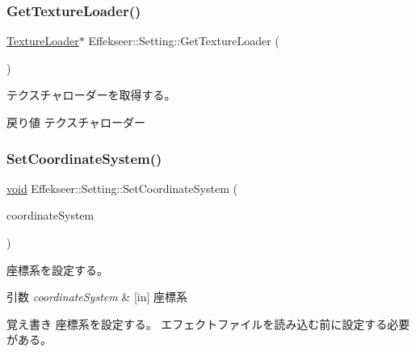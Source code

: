 \subsubsection{\texorpdfstring{Get\+Texture\+Loader()}{GetTextureLoader()}}
{\footnotesize\ttfamily \mbox{\hyperlink{class_effekseer_1_1_texture_loader}{Texture\+Loader}}$\ast$ Effekseer\+::\+Setting\+::\+Get\+Texture\+Loader (\begin{DoxyParamCaption}{ }\end{DoxyParamCaption})}



テクスチャローダーを取得する。 

\begin{DoxyReturn}{戻り値}
テクスチャローダー 
\end{DoxyReturn}
\mbox{\label{class_effekseer_1_1_setting_ab252bfe6bd18b3fafafae0e37351df72}} 
\subsubsection{\texorpdfstring{Set\+Coordinate\+System()}{SetCoordinateSystem()}}
{\footnotesize\ttfamily \mbox{\hyperlink{namespace_effekseer_ab34c4088e512200cf4c2716f168deb56}{void}} Effekseer\+::\+Setting\+::\+Set\+Coordinate\+System (\begin{DoxyParamCaption}\item[{\mbox{\hyperlink{namespace_effekseer_ac8508f8823c5fcf36aac5d2ddee23765}{Coordinate\+System}}}]{coordinate\+System }\end{DoxyParamCaption})}



座標系を設定する。 


\begin{DoxyParams}{引数}
{\em coordinate\+System} & \mbox{[}in\mbox{]} 座標系 \\
\hline
\end{DoxyParams}
\begin{DoxyNote}{覚え書き}
座標系を設定する。 エフェクトファイルを読み込む前に設定する必要がある。 
\end{DoxyNote}
\mbox{\label{class_effekseer_1_1_setting_acc38b8b4013c440242f1bba9a9696639}} 
